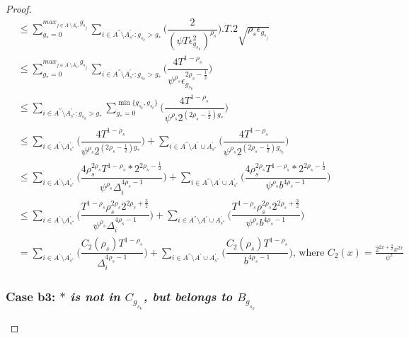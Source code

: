 \begin{proof}
\begin{align*}
 &\leq\sum_{g_{*}=0}^{max_{j\in A^{'}\setminus A_{s^*}^{'}}g_{s_{j}}}\sum_{i\in A^{''}\setminus A_{s^*}^{'}:g_{s_{k}}>g_{*}}\bigg(\dfrac{2}{(\psi T\epsilon_{g_{s_{k}}}^{2})^{\rho_{s}}} \bigg).T.2\sqrt{\rho_{s}\epsilon_{g_{s_{j}}}}\\
 &\leq\sum_{g_{*}=0}^{max_{j\in A^{'}\setminus A_{s^*}^{'}}g_{s_{j}}}\sum_{i\in A^{''}\setminus A_{s^*}^{'}:g_{s_{k}}>g_{*}}\bigg(\dfrac{4T^{1-\rho_{s}}}{\psi^{\rho_{s}}\epsilon_{g_{s_{k}}}^{2\rho_{s} - \frac{1}{2}}} \bigg)\\
 &\leq\sum_{i\in A^{''}\setminus A_{s^*}^{'}:g_{s_{k}}>g_{*}}\sum_{g_{*}=0}^{\min{\lbrace g_{s_{k}},g_{s_{b}}\rbrace}}\bigg(\dfrac{4T^{1-\rho_{s}}}{\psi^{\rho_{s}}2^{({2\rho_{s} - \frac{1}{2}})g_{*}}} \bigg) \\
 &\leq\sum_{i\in A^{'}\setminus A_{s^*}^{'}}\bigg(\dfrac{4T^{1-\rho_{s}}}{\psi^{\rho_{s}}2^{({2\rho_{s} - \frac{1}{2}})g_{*}}} \bigg)+\sum_{i\in A^{''}\setminus A^{'}\cup A_{s^*}^{'}}\bigg(\dfrac{4T^{1-\rho_{s}}}{\psi^{\rho_{s}}2^{({2\rho_{s} - \frac{1}{2}})g_{s_{b}}}} \bigg)\\ 
 &\leq\sum_{i\in A^{'}\setminus A_{s^*}^{'}}\bigg(\dfrac{4\rho_{s}^{2\rho_{s}}T^{1-\rho_{s}}*2^{2\rho_{s}-\frac{1}{2}}}{\psi^{\rho_{s}}\Delta_{i}^{4\rho_{s}-1}} \bigg)+\sum_{i\in A^{''}\setminus A^{'}\cup A_{s^*}^{'}}\bigg(\dfrac{4\rho_{s}^{2\rho_{s}}T^{1-\rho_{s}}*2^{2\rho_{s}-\frac{1}{2}}}{\psi^{\rho_{s}}b^{4\rho_{s}-1}} \bigg)\\
 &\leq\sum_{i\in A^{'}\setminus A_{s^*}^{'}}\bigg(\dfrac{T^{1-\rho_{s}}\rho_{s}^{2\rho_{s}}2^{2\rho_{s}+\frac{3}{2}}}{\psi^{\rho_{s}}\Delta_{i}^{4\rho_{s}-1}} \bigg)+\sum_{i\in A^{''}\setminus A^{'}\cup A_{s^*}^{'}}\bigg(\dfrac{T^{1-\rho_{s}}\rho_{s}^{2\rho_{s}}2^{2\rho_{s}+\frac{3}{2}}}{\psi^{\rho_{s}}b^{4\rho_{s}-1}} \bigg)\\
 & = \sum_{i\in A^{'}\setminus A_{s^*}^{'}}\bigg(\dfrac{C_{2}(\rho_{s})T^{1-\rho_{s}}}{\Delta_{i}^{4\rho_{s}-1}} \bigg)+\sum_{i\in A^{''}\setminus A^{'}\cup A_{s^*}^{'}}\bigg(\dfrac{C_{2}(\rho_{s})T^{1-\rho_{s}}}{b^{4\rho_{s}-1}} \bigg) \text{, where } C_2(x) = \frac{2^{2x+\frac{3}{2}}x^{2x}}{\psi^{x}}
\end{align*}

\subsubsection*{Case b3: \textit{${*}$ is not in $C_{g_{s_{k}}}$, but belongs to $B_{g_{s_{k}}}$} } 


\end{proof}
